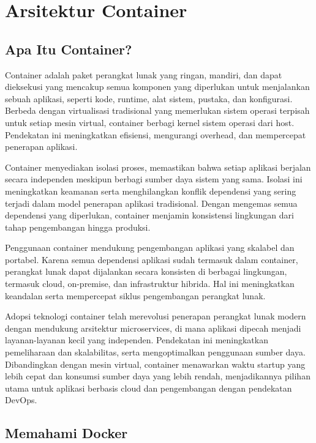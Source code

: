 
\chapter{Arsitektur Container}

\section{Apa Itu Container?}

Container adalah paket perangkat lunak yang ringan, mandiri, dan dapat dieksekusi yang mencakup semua komponen yang diperlukan untuk menjalankan sebuah aplikasi, seperti kode, runtime, alat sistem, pustaka, dan konfigurasi. Berbeda dengan virtualisasi tradisional yang memerlukan sistem operasi terpisah untuk setiap mesin virtual, container berbagi kernel sistem operasi dari host. Pendekatan ini meningkatkan efisiensi, mengurangi overhead, dan mempercepat penerapan aplikasi.

Container menyediakan isolasi proses, memastikan bahwa setiap aplikasi berjalan secara independen meskipun berbagi sumber daya sistem yang sama. Isolasi ini meningkatkan keamanan serta menghilangkan konflik dependensi yang sering terjadi dalam model penerapan aplikasi tradisional. Dengan mengemas semua dependensi yang diperlukan, container menjamin konsistensi lingkungan dari tahap pengembangan hingga produksi.

Penggunaan container mendukung pengembangan aplikasi yang skalabel dan portabel. Karena semua dependensi aplikasi sudah termasuk dalam container, perangkat lunak dapat dijalankan secara konsisten di berbagai lingkungan, termasuk cloud, on-premise, dan infrastruktur hibrida. Hal ini meningkatkan keandalan serta mempercepat siklus pengembangan perangkat lunak.

Adopsi teknologi container telah merevolusi penerapan perangkat lunak modern dengan mendukung arsitektur microservices, di mana aplikasi dipecah menjadi layanan-layanan kecil yang independen. Pendekatan ini meningkatkan pemeliharaan dan skalabilitas, serta mengoptimalkan penggunaan sumber daya. Dibandingkan dengan mesin virtual, container menawarkan waktu startup yang lebih cepat dan konsumsi sumber daya yang lebih rendah, menjadikannya pilihan utama untuk aplikasi berbasis cloud dan pengembangan dengan pendekatan DevOps.

\section{Memahami Docker}


